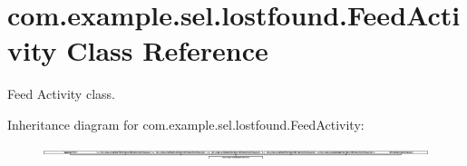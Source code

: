 \hypertarget{classcom_1_1example_1_1sel_1_1lostfound_1_1FeedActivity}{}\section{com.\+example.\+sel.\+lostfound.\+Feed\+Activity Class Reference}
\label{classcom_1_1example_1_1sel_1_1lostfound_1_1FeedActivity}


Feed Activity class.  


Inheritance diagram for com.\+example.\+sel.\+lostfound.\+Feed\+Activity\+:\begin{figure}[H]
\begin{center}
\leavevmode
\includegraphics[height=0.347826cm]{classcom_1_1example_1_1sel_1_1lostfound_1_1FeedActivity}
\end{center}
\end{figure}
